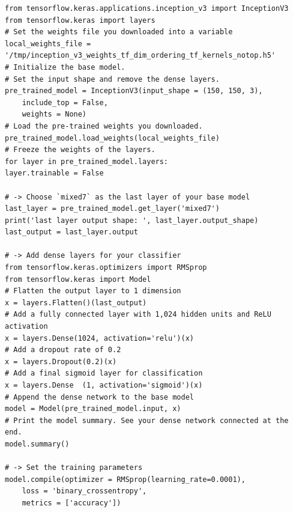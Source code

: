 \documentclass[20pt]{article}
\begin{document}
\begin{itemize}
\begin{verbatim}
from tensorflow.keras.applications.inception_v3 import InceptionV3
from tensorflow.keras import layers
# Set the weights file you downloaded into a variable
local_weights_file = '/tmp/inception_v3_weights_tf_dim_ordering_tf_kernels_notop.h5'
# Initialize the base model.
# Set the input shape and remove the dense layers.
pre_trained_model = InceptionV3(input_shape = (150, 150, 3), 
	include_top = False, 
	weights = None)
# Load the pre-trained weights you downloaded.
pre_trained_model.load_weights(local_weights_file)
# Freeze the weights of the layers.
for layer in pre_trained_model.layers:
layer.trainable = False

# -> Choose `mixed7` as the last layer of your base model
last_layer = pre_trained_model.get_layer('mixed7')
print('last layer output shape: ', last_layer.output_shape)
last_output = last_layer.output

# -> Add dense layers for your classifier
from tensorflow.keras.optimizers import RMSprop
from tensorflow.keras import Model
# Flatten the output layer to 1 dimension
x = layers.Flatten()(last_output)
# Add a fully connected layer with 1,024 hidden units and ReLU activation
x = layers.Dense(1024, activation='relu')(x)
# Add a dropout rate of 0.2
x = layers.Dropout(0.2)(x)                  
# Add a final sigmoid layer for classification
x = layers.Dense  (1, activation='sigmoid')(x)           
# Append the dense network to the base model
model = Model(pre_trained_model.input, x) 
# Print the model summary. See your dense network connected at the end.
model.summary()

# -> Set the training parameters
model.compile(optimizer = RMSprop(learning_rate=0.0001), 
	loss = 'binary_crossentropy', 
	metrics = ['accuracy'])


\end{verbatim}
\end{itemize}
\end{document}
